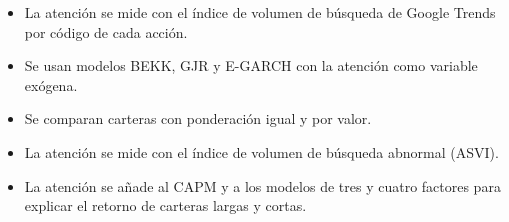 \documentclass{article}
\newcommand{\cardtitlesize}{\fontsize{34.2}{41.0}\selectfont}
\newcommand{\cardtitle}[2][navy]{{\color{#1}\cardtitlesize\bfseries\textls[110]{\MakeUppercase{#2}}}\par\vspace{7mm}}
\begin{document}
\vfill
\hspace*{34mm}\begin{minipage}{773mm}
\begin{tcolorbox}[card]\cardtitle{Metodología}
\begin{minipage}[t]{0.48\linewidth}
\begin{itemize}
\item La atención se mide con el índice de volumen de búsqueda de Google Trends por código de cada acción.
\item Se usan modelos BEKK, GJR y E-GARCH con la atención como variable exógena.
\item Se comparan carteras con ponderación igual y por valor.
\end{itemize}
\end{minipage}\hfill
\begin{minipage}[t]{0.48\linewidth}
\begin{itemize}
\item La atención se mide con el índice de volumen de búsqueda abnormal (ASVI).
\item La atención se añade al CAPM y a los modelos de tres y cuatro factores para explicar el retorno de carteras largas y cortas.
\end{itemize}
\end{minipage}
\end{tcolorbox}
\end{minipage}
\end{document}
